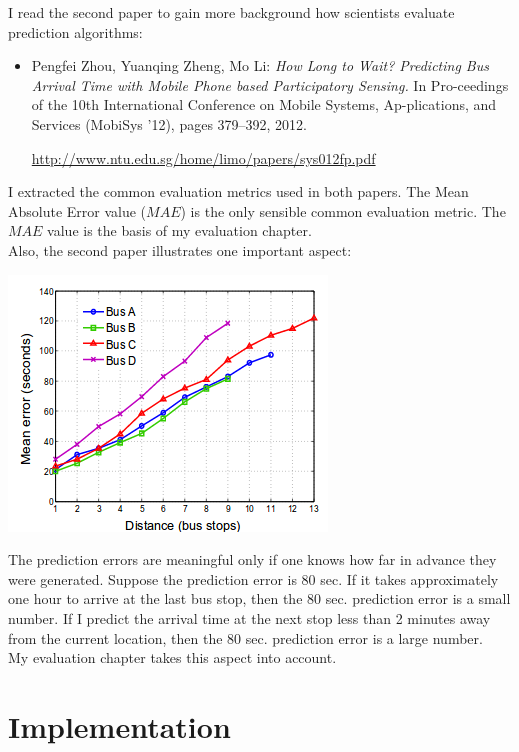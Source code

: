 \documentclass[12pt,a4paper,oneside,openright]{report}
\begin{document}
I read the second paper to gain more background how scientists evaluate prediction algorithms:

\begin{itemize}

\item Pengfei Zhou, Yuanqing Zheng, Mo Li: \textit{How Long to Wait? Predicting Bus Arrival Time
      with Mobile Phone based Participatory Sensing.} In Pro-ceedings of the 10th International Conference on Mobile Systems,
      Ap-plications, and Services (MobiSys ’12), pages 379–392, 2012.

\textcolor{blue}{\url{http://www.ntu.edu.sg/home/limo/papers/sys012fp.pdf}}

\end{itemize}

I extracted the common evaluation metrics used in both papers. The Mean Absolute Error value
($MAE$) is the only sensible common evaluation metric. The $MAE$ value is the basis of my evaluation
chapter. \\

Also, the second paper illustrates one important aspect:

\includegraphics[scale=0.8]{figs/second_paper.png}

The prediction errors are meaningful only if one knows how far in advance they were
generated. Suppose the prediction error is 80 sec. If it takes approximately one hour to arrive at
the last bus stop, then the 80 sec. prediction error is a small number.
If I predict the arrival time at the next stop less than 2 minutes away from the current location,
then the 80 sec. prediction error is a large number. \\

My evaluation chapter takes this aspect into account.




\chapter{Implementation}
\end{document}
